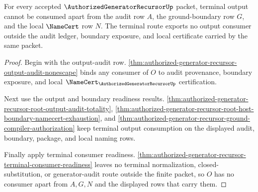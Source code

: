 \begin{theorem}
\label{thm:authorized-generator-recursor-terminal-audit-namecert-nonescape}
For every accepted $\AuthorizedGeneratorRecursorUp$ packet, terminal output cannot be consumed apart from the audit row $A$, the ground-boundary row $G$, and the local $\NameCert$ row $N$. The terminal route exports no output consumer outside the audit ledger, boundary exposure, and local certificate carried by the same packet.
\end{theorem}
\begin{proof}
Begin with the output-audit row. \autoref{thm:authorized-generator-recursor-output-audit-nonescape} binds any consumer of $O$ to audit provenance, boundary exposure, and local $\NameCert_{\AuthorizedGeneratorRecursorUp}$ certification.

Next use the output and boundary readiness results. \autoref{thm:authorized-generator-recursor-root-output-audit-totality}, \autoref{thm:authorized-generator-recursor-root-host-boundary-namecert-exhaustion}, and \autoref{thm:authorized-generator-recursor-ground-compiler-authorization} keep terminal output consumption on the displayed audit, boundary, package, and local naming rows.

Finally apply terminal consumer readiness. \autoref{thm:authorized-generator-recursor-terminal-consumer-readiness} leaves no terminal normalization, closed-substitution, or generator-audit route outside the finite packet, so $O$ has no consumer apart from $A,G,N$ and the displayed rows that carry them.
\end{proof}

